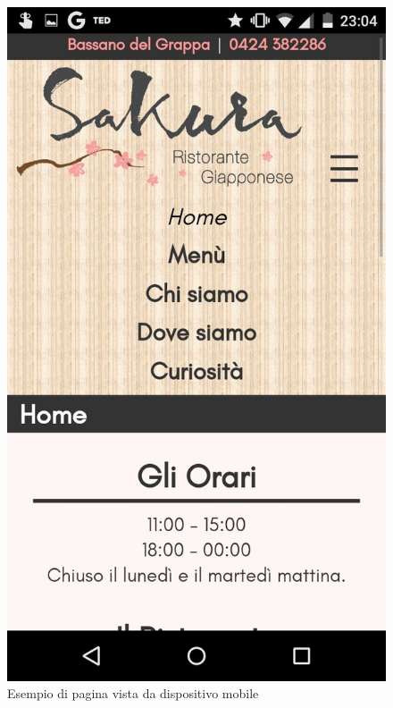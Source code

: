 \documentclass[../relazione.tex]{subfiles}
\begin{document}
	\begin{figure}[H]
		\centering
		\includegraphics[scale=0.2]{images/mobile2}
		\caption{Esempio di pagina vista da dispositivo mobile}
		\label{fig:Esempio di pagina vista da dispositivo mobile}
	\end{figure}
\end{document}
